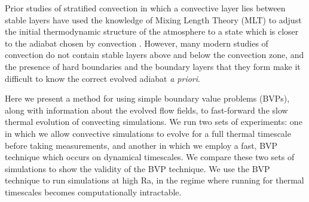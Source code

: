 \documentclass[aps, pre, onecolumn, nofootinbib, notitlepage, groupedaddress, amsfonts, amssymb, amsmath, longbibliography]{revtex4-1}
\begin{document}
Prior studies of stratified convection in which a convective layer lies between stable layers
have used the knowledge of Mixing Length Theory (MLT) to adjust the initial thermodynamic structure of
the atmosphere to a state which is closer to the adiabat chosen by convection \cite{brandenburg&all2005}.
However, many modern studies of convection do not contain stable layers above and below the convection
zone, and the presence of hard boundaries and the boundary layers that they form make it difficult to
know the correct evolved adiabat \emph{a priori}.

Here we present a method for using simple boundary value problems (BVPs), 
along with information about the evolved flow fields,
to fast-forward the slow thermal evolution of convecting simulations.  
We run two sets of experiments: one in which we allow convective simulations to evolve for a
full thermal timescale before taking measurements, and another in which we employ a fast,
BVP technique which occurs on dynamical timescales. We compare these two sets of simulations to
show the validity of the BVP technique.  We use the BVP technique to run simulations
at high Ra, in the regime where running for thermal timescales becomes computationally intractable.
\end{document}
